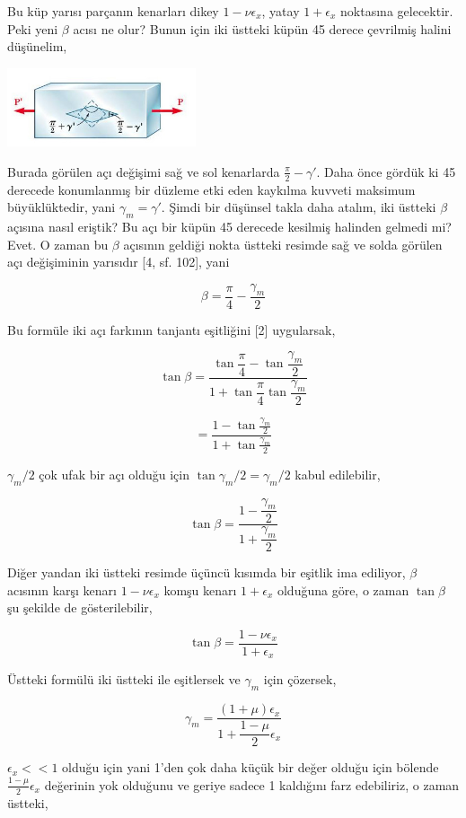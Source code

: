 \documentclass[12pt,fleqn]{article}\usepackage{../../common}
\begin{document}
Bu küp yarısı parçanın kenarları dikey $1-\nu \epsilon_x$, yatay $1 + \epsilon_x$
noktasına gelecektir. Peki yeni $\beta$ acısı ne olur? Bunun için iki
üstteki küpün 45 derece çevrilmiş halini düşünelim,

\includegraphics[width=15em]{phy_020_strs_06_09.jpg}

Burada görülen açı değişimi sağ ve sol kenarlarda $\frac{\pi}{2} - \gamma'$.
Daha önce gördük ki 45 derecede konumlanmış bir düzleme etki eden kaykılma
kuvveti maksimum büyüklüktedir, yani $\gamma_m = \gamma'$. Şimdi bir düşünsel
takla daha atalım, iki üstteki $\beta$ açısına nasıl eriştik? Bu açı bir küpün
45 derecede kesilmiş halinden gelmedi mi? Evet. O zaman bu $\beta$ açısının
geldiği nokta üstteki resimde sağ ve solda görülen açı değişiminin yarısıdır
[4, sf. 102], yani

$$
\beta = \frac{\pi}{4} - \frac{\gamma_m}{2}
$$

Bu formüle iki açı farkının tanjantı eşitliğini [2] uygularsak,

$$
\tan \beta =
\dfrac{\tan \dfrac{\pi}{4} - \tan \dfrac{\gamma_m}{2}}
      {1 + \tan \dfrac{\pi}{4} \tan \dfrac{\gamma_m}{2}}
$$

$$
= \frac{1 - \tan \frac{\gamma_m}{2}}{1 + \tan \frac{\gamma_m}{2} }
$$

$\gamma_m / 2$ çok ufak bir açı olduğu için $\tan \gamma_m / 2 = \gamma_m / 2$
kabul edilebilir,

$$
\tan \beta = \dfrac{1 - \dfrac{\gamma_m}{2}}{1 + \dfrac{\gamma_m}{2}}
$$

Diğer yandan iki üstteki resimde üçüncü kısımda bir eşitlik ima ediliyor,
$\beta$ acısının karşı kenarı $1 - \nu \epsilon_x$ komşu kenarı $1 +
\epsilon_x$ olduğuna göre, o zaman $\tan\beta$ şu şekilde de gösterilebilir,

$$
\tan\beta = \frac{1 - \nu \epsilon_x}{1 + \epsilon_x}
$$

Üstteki formülü iki üstteki ile eşitlersek ve $\gamma_m$ için çözersek,

$$
\gamma_m = \dfrac{(1+\mu)\epsilon_x}{ 1 + \dfrac{1-\mu}{2} \epsilon_x}
$$

$\epsilon_x << 1$ olduğu için yani 1'den çok daha küçük bir değer olduğu için
bölende $\frac{1-\mu}{2} \epsilon_x$ değerinin yok olduğunu ve geriye
sadece 1 kaldığını farz edebiliriz, o zaman üstteki,
\end{document}
